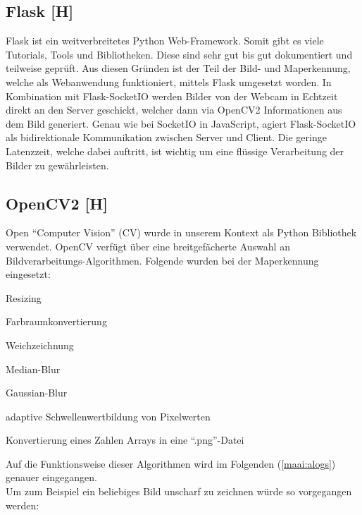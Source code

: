\subsection{Flask [H]}
Flask ist ein weitverbreitetes Python Web-Framework. Somit gibt es viele Tutorials,
Tools und Bibliotheken. Diese sind sehr gut bis gut dokumentiert und teilweise geprüft.
Aus diesen Gründen ist der Teil der Bild- und Maperkennung, welche
als Webanwendung funktioniert, mittels Flask umgesetzt worden. In Kombination mit Flask-SocketIO werden Bilder von der Webcam
in Echtzeit direkt an den Server geschickt, welcher dann via OpenCV2 Informationen aus dem Bild
generiert. Genau wie bei SocketIO in JavaScript, agiert Flask-SocketIO als bidirektionale
Kommunikation zwischen Server und Client. Die geringe Latenzzeit, welche dabei auftritt,
ist wichtig um eine flüssige Verarbeitung der Bilder zu gewährleisten.

\subsection{OpenCV2 [H]}
Open ``Computer Vision'' (CV) wurde in unserem Kontext als Python Bibliothek verwendet. OpenCV verfügt über eine
breitgefächerte Auswahl an Bildverarbeitungs-Algorithmen.
Folgende wurden bei der Maperkennung eingesetzt:
\begin{compactitem}
  \item Resizing
  \item Farbraumkonvertierung
  \item Weichzeichnung
  \begin{compactitem}
    \item Median-Blur
    \item Gaussian-Blur
  \end{compactitem}
  \item adaptive Schwellenwertbildung von Pixelwerten
  \item Konvertierung eines Zahlen Arrays in eine ``.png''-Datei
\end{compactitem}
Auf die Funktionsweise dieser Algorithmen wird im Folgenden (\ref{maai:alogs}) genauer eingegangen.
\\
Um zum Beispiel ein beliebiges Bild unscharf zu zeichnen würde so vorgegangen werden:\cite{opencvdoc}
\\

